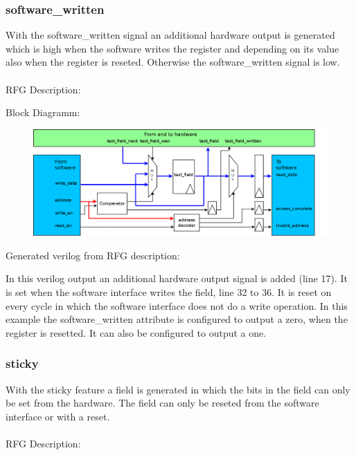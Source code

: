 \documentclass[12pt,a4paper]{article}
\begin{document}
\subsubsection{software\_written}
With the software\_written signal an additional hardware output is generated which is high when the software writes the register and depending on its value also when the register is reseted. Otherwise the software\_written signal is low.\\
\\
RFG Description:


Block Diagramm:
\begin{figure}[h!]
    \includegraphics[width=\textwidth]{pictures/Reg_hrw_srw_swritten.png}
\end{figure}
\newpage
Generated verilog from RFG description:

In this verilog output an additional hardware output signal is added (line 17). It is set when the software interface writes the field, line 32 to 36. It is reset on every cycle in which the software interface does not do a write operation. In this example the software\_written attribute is configured to output a zero, when the register is resetted. It can also be configured to output a one.
\newpage
\subsubsection{sticky}
With the sticky feature a field is generated in which the bits in the field can only be set from the hardware. The field can only be reseted from the software interface or with a reset.\\
\\
RFG Description:

\end{document}
